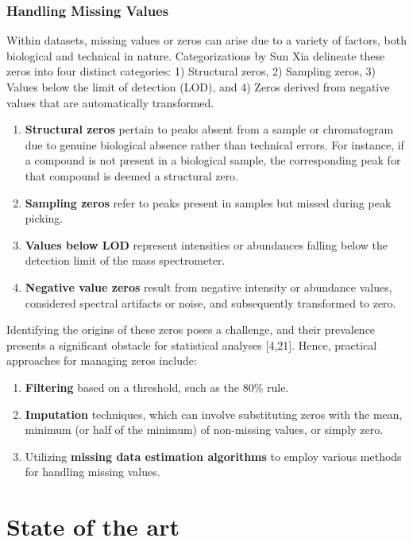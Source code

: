 \documentclass[ENG, BIB]{TFUOC}%
\begin{document}
\subsubsection{Handling Missing Values}
Within datasets, missing values or zeros can arise due to a variety of factors, both biological and technical in nature. Categorizations by Sun Xia delineate these zeros into four distinct categories: 1) Structural zeros, 2) Sampling zeros, 3) Values below the limit of detection (LOD), and 4) Zeros derived from negative values that are automatically transformed.
\begin{enumerate}
    \item \textbf{Structural zeros} pertain to peaks absent from a sample or chromatogram due to genuine biological absence rather than technical errors. For instance, if a compound is not present in a biological sample, the corresponding peak for that compound is deemed a structural zero.
    \item \textbf{Sampling zeros} refer to peaks present in samples but missed during peak picking.
    \item \textbf{Values below LOD} represent intensities or abundances falling below the detection limit of the mass spectrometer.
    \item \textbf{Negative value zeros} result from negative intensity or abundance values,
    considered spectral artifacts or noise, and subsequently transformed to zero.
\end{enumerate}

Identifying the origins of these zeros poses a challenge, and their prevalence presents a significant obstacle for statistical analyses [4,21]. Hence, practical approaches for managing zeros include:
\begin{enumerate}
    \item \textbf{Filtering} based on a threshold, such as the 80\% rule.
    \item \textbf{Imputation} techniques, which can involve substituting zeros with the mean, minimum (or half of the minimum) of non-missing values, or simply zero.
    \item Utilizing \textbf{missing data estimation algorithms} to employ various methods for handling missing values.
\end{enumerate}

\section{State of the art}
\end{document}
